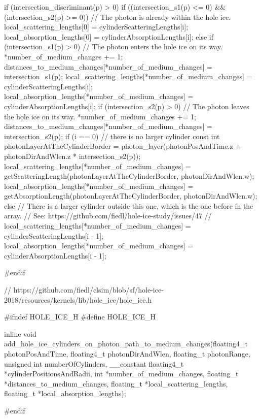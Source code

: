 \begin{ccode}
{{{      if (intersection_discriminant(p) > 0) {
        if ((intersection_s1(p) <= 0) && (intersection_s2(p) >= 0)) {
          // The photon is already within the hole ice.
          local_scattering_lengths[0] = cylinderScatteringLengths[i];
          local_absorption_lengths[0] = cylinderAbsorptionLengths[i];
        } else if (intersection_s1(p) > 0) {
          // The photon enters the hole ice on its way.
          *number_of_medium_changes += 1;
          distances_to_medium_changes[*number_of_medium_changes] = intersection_s1(p);
          local_scattering_lengths[*number_of_medium_changes] = cylinderScatteringLengths[i];
          local_absorption_lengths[*number_of_medium_changes] = cylinderAbsorptionLengths[i];
        }
        if (intersection_s2(p) > 0) {
          // The photon leaves the hole ice on its way.
          *number_of_medium_changes += 1;
          distances_to_medium_changes[*number_of_medium_changes] = intersection_s2(p);
          if (i == 0) // there is no larger cylinder
          {
            const int photonLayerAtTheCylinderBorder =
                photon_layer(photonPosAndTime.z + photonDirAndWlen.z * intersection_s2(p));
            local_scattering_lengths[*number_of_medium_changes] =
                getScatteringLength(photonLayerAtTheCylinderBorder, photonDirAndWlen.w);
            local_absorption_lengths[*number_of_medium_changes] =
                getAbsorptionLength(photonLayerAtTheCylinderBorder, photonDirAndWlen.w);
          } else {
            // There is a larger cylinder outside this one, which is the one before in the array.
            // See: https://github.com/fiedl/hole-ice-study/issues/47
            //
            local_scattering_lengths[*number_of_medium_changes] = cylinderScatteringLengths[i - 1];
            local_absorption_lengths[*number_of_medium_changes] = cylinderAbsorptionLengths[i - 1];
          }
        }
      }

    }
  }

}

#endif
\end{ccode}

\begin{ccode}
// https://github.com/fiedl/clsim/blob/sf/hole-ice-2018/resources/kernels/lib/hole_ice/hole_ice.h

#ifndef HOLE_ICE_H
#define HOLE_ICE_H

inline void add_hole_ice_cylinders_on_photon_path_to_medium_changes(floating4_t photonPosAndTime, floating4_t photonDirAndWlen, floating_t photonRange, unsigned int numberOfCylinders, __constant floating4_t *cylinderPositionsAndRadii, int *number_of_medium_changes, floating_t *distances_to_medium_changes, floating_t *local_scattering_lengths, floating_t *local_absorption_lengths);

#endif
\end{ccode}

